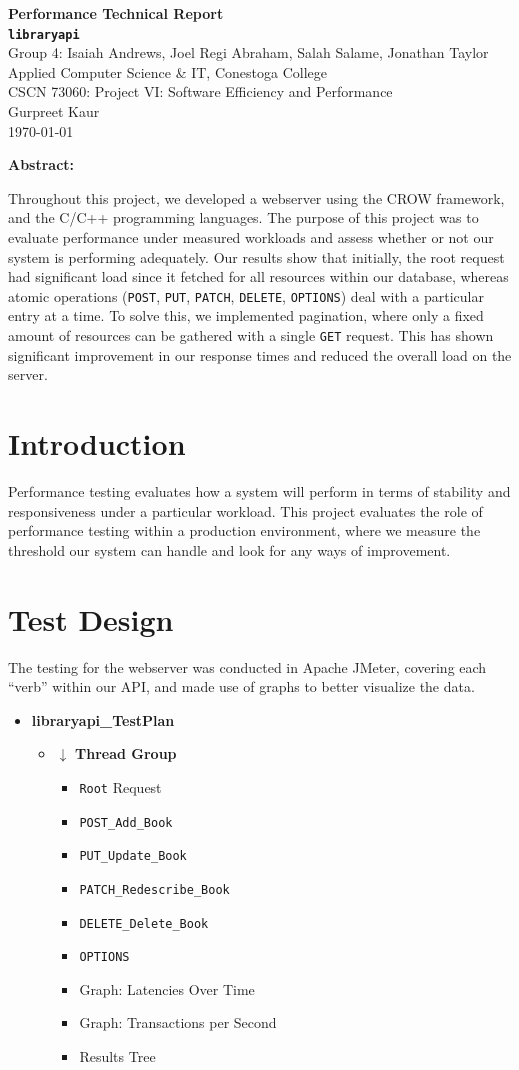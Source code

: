 \documentclass[a4paper, 12pt]{article}
\affiliation \\
\newcommand{\studentname}{Group 4: Isaiah Andrews, Joel Regi Abraham, Salah Salame, Jonathan Taylor}
\newcommand{\affiliation}{Applied Computer Science \& IT, Conestoga College}
\newcommand{\course}{CSCN 73060: Project VI: Software Efficiency and Performance}
\newcommand{\instructor}{Gurpreet Kaur}
\newcommand{\duedate}{\today}
\newcommand{\maintitle}{Performance Technical Report}
\newcommand{\subtitle}{\texttt{\textbf{libraryapi}}}
\newcommand{\conestogatitlepage}{
    \thispagestyle{plain}
    \fancypagestyle{plain}{
        \fancyhf{}
        \renewcommand{\headrulewidth}{0pt}
        \fancyhead[R]{\thepage}
    }

    \vspace*{3\baselineskip}
    \begin{center}
        {\bfseries \maintitle \\ \subtitle}
        \vspace*{\baselineskip} \\
        \studentname \\
        \affiliation \\
        \course \\
        \instructor \\
        \duedate \\
    \end{center}
}
\begin{document}
\conestogatitlepage
\newpage

\tableofcontents
\newpage

\textbf{Abstract:}
\par Throughout this project, we developed a webserver using the CROW framework, and the C/C++ programming languages. The purpose
of this project was to evaluate performance under measured workloads and assess whether or not our system is performing adequately.
Our results show that initially, the root request had significant load since it fetched for all resources within our database, whereas
atomic operations (\texttt{POST}, \texttt{PUT}, \texttt{PATCH}, \texttt{DELETE}, \texttt{OPTIONS}) deal with a particular entry at a time.
To solve this, we implemented pagination, where only a fixed amount of resources can be gathered with a single \texttt{GET} request. This has shown
significant improvement in our response times and reduced the overall load on the server.

\section{Introduction}
\par Performance testing evaluates how a system will perform in terms of
stability and responsiveness under a particular workload. This project evaluates 
the role of performance testing within a production environment, where we measure the
threshold our system can handle and look for any ways of improvement.

\section{Test Design}
\par The testing for the webserver was conducted in Apache JMeter, covering each \enquote{verb} within our
API, and made use of graphs to better visualize the data.

\begin{itemize}
    \item \textbf{libraryapi\_TestPlan}
    \begin{itemize}
        \item $\downarrow$ \textbf{Thread Group}
        \begin{itemize}
            \item \texttt{Root} Request
            \item \texttt{POST\_Add\_Book}
            \item \texttt{PUT\_Update\_Book}
            \item \texttt{PATCH\_Redescribe\_Book}
            \item \texttt{DELETE\_Delete\_Book}
            \item \texttt{OPTIONS}
            \item Graph: Latencies Over Time
            \item Graph: Transactions per Second
            \item Results Tree
        \end{itemize}
    \end{itemize}
\end{itemize}
\end{document}
